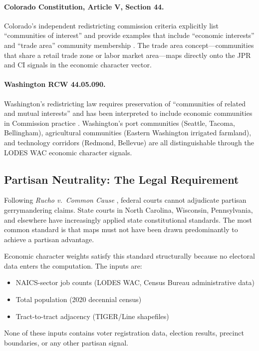 \paragraph{Colorado Constitution, Article V, Section 44.}
Colorado's independent redistricting commission criteria explicitly list
``communities of interest'' and provide examples that include ``economic
interests'' and ``trade area'' community membership \citep{coart5s44}.
The trade area concept---communities that share a retail trade zone or
labor market area---maps directly onto the JPR and CI signals in the
economic character vector.

\paragraph{Washington RCW 44.05.090.}
Washington's redistricting law requires preservation of ``communities
of related and mutual interests'' and has been interpreted to include
economic communities in Commission practice \citep{warcw44}.
Washington's port communities (Seattle, Tacoma, Bellingham), agricultural
communities (Eastern Washington irrigated farmland), and technology
corridors (Redmond, Bellevue) are all distinguishable through the
LODES WAC economic character signals.

\subsection{Partisan Neutrality: The Legal Requirement}

Following \textit{Rucho v.\ Common Cause} \citeyearpar{rucho2019}, federal
courts cannot adjudicate partisan gerrymandering claims.
State courts in North Carolina, Wisconsin, Pennsylvania, and elsewhere
have increasingly applied state constitutional standards.
The most common standard is that maps must not have been drawn predominantly
to achieve a partisan advantage.

Economic character weights satisfy this standard structurally because no
electoral data enters the computation.
The inputs are:
\begin{itemize}
  \item NAICS-sector job counts (LODES WAC, Census Bureau administrative data)
  \item Total population (2020 decennial census)
  \item Tract-to-tract adjacency (TIGER/Line shapefiles)
\end{itemize}
None of these inputs contains voter registration data, election results,
precinct boundaries, or any other partisan signal.

